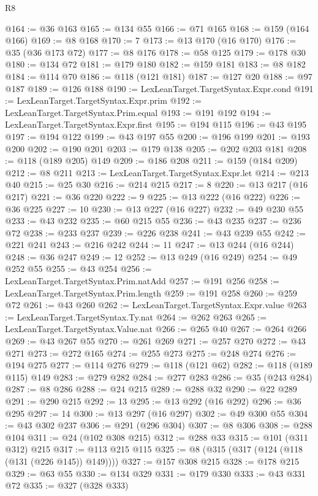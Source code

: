 \begin{lexlean}{R8}
\begin{coremodule}
@164 := @36 @163
@165 := @134 @55
@166 := @71 @165
@168 := @159 (@164 @166)
@169 := @8 @168
@170 := 7
@173 := @13 @170 (@16 @170)
@176 := @35 (@36 @173 @72)
@177 := @8 @176
@178 := @58 @125
@179 := @178 @30
@180 := @134 @72
@181 := @179 @180
@182 := @159 @181
@183 := @8 @182
@184 := @114 @70
@186 := @118 (@121 @181)
@187 := @127 @20
@188 := @97 @187
@189 := @126 @188
@190 := LexLeanTarget.TargetSyntax.Expr.cond
@191 := LexLeanTarget.TargetSyntax.Expr.prim
@192 := LexLeanTarget.TargetSyntax.Prim.equal
@193 := @191 @192
@194 := LexLeanTarget.TargetSyntax.Expr.first
@195 := @194 @115
@196 := @43 @195
@197 := @194 @122
@199 := @43 @197 @55
@200 := @196 @199
@201 := @193 @200
@202 := @190 @201
@203 := @179 @138
@205 := @202 @203 @181
@208 := @118 (@189 @205) @149
@209 := @186 @208
@211 := @159 (@184 @209)
@212 := @8 @211
@213 := LexLeanTarget.TargetSyntax.Expr.let
@214 := @213 @40
@215 := @25 @30
@216 := @214 @215
@217 := 8
@220 := @13 @217 (@16 @217)
@221 := @36 @220
@222 := 9
@225 := @13 @222 (@16 @222)
@226 := @36 @225
@227 := 10
@230 := @13 @227 (@16 @227)
@232 := @49 @230 @55
@233 := @43 @232
@235 := @60 @215 @55
@236 := @43 @235
@237 := @236 @72
@238 := @233 @237
@239 := @226 @238
@241 := @43 @239 @55
@242 := @221 @241
@243 := @216 @242
@244 := 11
@247 := @13 @244 (@16 @244)
@248 := @36 @247
@249 := 12
@252 := @13 @249 (@16 @249)
@254 := @49 @252 @55
@255 := @43 @254
@256 := LexLeanTarget.TargetSyntax.Prim.natAdd
@257 := @191 @256
@258 := LexLeanTarget.TargetSyntax.Prim.length
@259 := @191 @258
@260 := @259 @72
@261 := @43 @260
@262 := LexLeanTarget.TargetSyntax.Expr.value
@263 := LexLeanTarget.TargetSyntax.Ty.nat
@264 := @262 @263
@265 := LexLeanTarget.TargetSyntax.Value.nat
@266 := @265 @40
@267 := @264 @266
@269 := @43 @267 @55
@270 := @261 @269
@271 := @257 @270
@272 := @43 @271
@273 := @272 @165
@274 := @255 @273
@275 := @248 @274
@276 := @194 @275
@277 := @114 @276
@279 := @118 (@121 @62)
@282 := @118 (@189 @115) @149
@283 := @279 @282
@284 := @277 @283
@286 := @35 (@243 @284)
@287 := @8 @286
@288 := @24 @215
@289 := @288 @32
@290 := @22 @289
@291 := @290 @215
@292 := 13
@295 := @13 @292 (@16 @292)
@296 := @36 @295
@297 := 14
@300 := @13 @297 (@16 @297)
@302 := @49 @300 @55
@304 := @43 @302 @237
@306 := @291 (@296 @304)
@307 := @8 @306
@308 := @288 @104
@311 := @24 (@102 @308 @215)
@312 := @288 @33
@315 := @101 (@311 @312) @215
@317 := @113 @215 @115
@325 := @8 (@315 (@317 (@124 (@118 (@131 (@226 @145)) @149))))
@327 := @157 @308 @215
@328 := @178 @215
@329 := @63 @55
@330 := @134 @329
@331 := @179 @330
@333 := @43 @331 @72
@335 := @327 (@328 @333)

\end{coremodule}
\end{lexlean}
